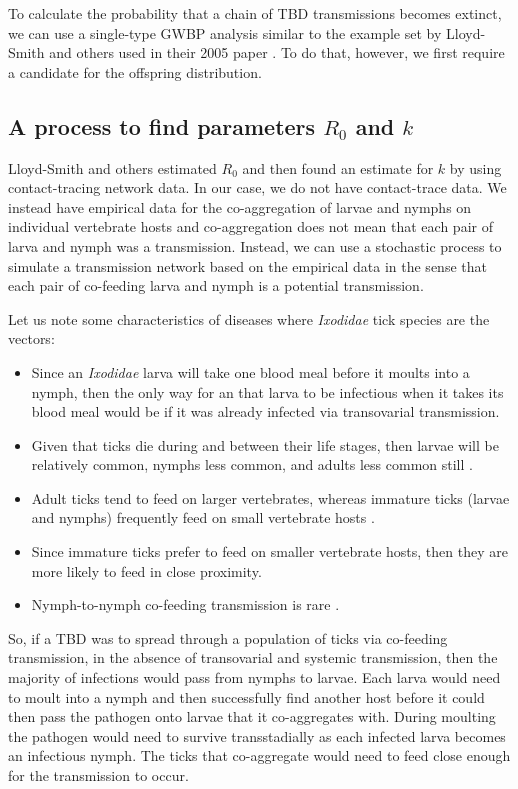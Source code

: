 \documentclass{article}
\begin{document}
To calculate the probability that a chain of TBD transmissions becomes extinct, we can use a single-type GWBP analysis similar to the example set by Lloyd-Smith and others used in their 2005 paper \cite{LloydSmith2005}. To do that, however, we first require a candidate for the offspring distribution.

\subsection{A process to find parameters \texorpdfstring{$ R_0 $}{R0} and \texorpdfstring{$ k $}{k}}

Lloyd-Smith and others estimated $ R_0 $ and then found an estimate for $ k $ by using contact-tracing network data. In our case, we do not have contact-trace data. We instead have empirical data for the co-aggregation of larvae and nymphs on individual vertebrate hosts and co-aggregation does not mean that each pair of larva and nymph was a transmission. Instead, we can use a stochastic process to simulate a transmission network based on the empirical data in the sense that each pair of co-feeding larva and nymph is a potential transmission.

Let us note some characteristics of diseases where \textit{Ixodidae} tick species are the vectors:
\begin{itemize}
	\item Since an \textit{Ixodidae} larva will take one blood meal before it moults into a nymph, then the only way for an that larva to be infectious when it takes its blood meal would be if it was already infected via transovarial transmission.
	\item Given that ticks die during and between their life stages, then larvae will be relatively common, nymphs less common, and adults less common still \cite{Randolph1998}.
	\item Adult ticks tend to feed on larger vertebrates, whereas immature ticks (larvae and nymphs) frequently feed on small vertebrate hosts \cite{Herrmann2015, Randolph1998}.
	\item Since immature ticks prefer to feed on smaller vertebrate hosts, then they are more likely to feed in close proximity.
	\item Nymph-to-nymph co-feeding transmission is rare \cite{VOORDOUW2014}.
\end{itemize}

So, if a TBD was to spread through a population of ticks via co-feeding transmission, in the absence of transovarial and systemic transmission, then the majority of infections would pass from nymphs to larvae. Each larva would need to moult into a nymph and then successfully find another host before it could then pass the pathogen onto larvae that it co-aggregates with. During moulting the pathogen would need to survive transstadially as each infected larva becomes an infectious nymph. The ticks that co-aggregate would need to feed close enough for the transmission to occur.
\end{document}
